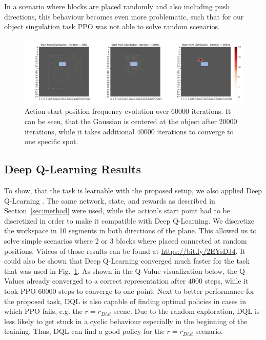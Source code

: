 \documentclass{article}
\newcommand{\myfigref}[1]{Fig.~\ref{#1}}
\newcommand{\mysecref}[1]{Section~\ref{#1}}
\begin{document}
In a scenario where blocks are placed randomly and also including push directions, this behaviour becomes even more problematic, such that for our object singulation task PPO was not able to solve random scenarios.

\begin{figure}[!ht]
\centering
\includegraphics[width=14cm]{figures/ppo_distribution_evolution.jpeg}
\caption{Action start position frequency evolution over 60000 iterations. It can be seen, that the Gaussian is centered at the object after 20000 iterations, while it takes additional 40000 iterations to converge to one specific spot.}
\label{fig:ppo_evolution}
\end{figure}

\subsection{Deep Q-Learning Results}
To show, that the task is learnable with the proposed setup, we also applied Deep Q-Learning \citep{deepq}. The same network, state, and rewards as described in \mysecref{sec:method} were used, while the action's start point had to be discretized in order to make it compatible with Deep Q-Learning. We discretize the workspace in 10 segments in both directions of the plane. This allowed us to solve simple scenarios where 2 or 3 blocks where placed connected at random positions. Videos of those results can be found at \href{https://bit.ly/2EYsDJ4}{https://bit.ly/2EYsDJ4}. 
\newline
It could also be shown that Deep Q-Learning converged much faster for the task that was used in \myfigref{fig:ppo_evolution}. As shown in the Q-Value visualization below, the Q-Values already converged to a correct representation after $4000$ steps, while it took PPO $60000$ steps to converge to one point. Next to better performance for the proposed task, DQL is also capable of finding optimal policies in cases in which PPO fails, e.g. the $r = r_{Dist}$ scene. Due to the random exploration, DQL is less likely to get stuck in a cyclic behaviour especially in the beginning of the training. Thus, DQL can find a good policy for the $r = r_{Dist}$ scenario. 
\end{document}
